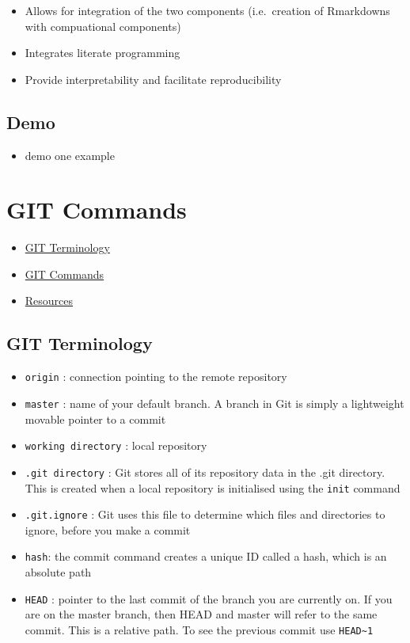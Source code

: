 \documentclass[
]{book}
\providecommand{\tightlist}{%
  \setlength{\itemsep}{0pt}\setlength{\parskip}{0pt}}
\begin{document}
\begin{itemize}
\tightlist
\item
  Allows for integration of the two components (i.e.~creation of Rmarkdowns with compuational components)
\item
  Integrates literate programming
\item
  Provide interpretability and facilitate reproducibility
\end{itemize}

\hypertarget{demo}{%
\section{Demo}\label{demo}}

\begin{itemize}
\tightlist
\item
  demo one example
\end{itemize}

\hypertarget{git-commands}{%
\chapter{GIT Commands}\label{git-commands}}

\begin{itemize}
\tightlist
\item
  \protect\hyperlink{git-terminology}{GIT Terminology}
\item
  \protect\hyperlink{git-commands}{GIT Commands}
\item
  \protect\hyperlink{resources}{Resources}
\end{itemize}

\hypertarget{git-terminology}{%
\section{GIT Terminology}\label{git-terminology}}

\begin{itemize}
\item
  \texttt{origin} : connection pointing to the remote repository
\item
  \texttt{master} : name of your default branch. A branch in Git is simply a lightweight movable pointer to a commit
\item
  \texttt{working\ directory} : local repository
\item
  \texttt{.git\ directory} : Git stores all of its repository data in the .git directory. This is created when a local repository is initialised using the \texttt{init} command
\item
  \texttt{.git.ignore} : Git uses this file to determine which files and directories to ignore, before you make a commit
\item
  \texttt{hash}: the commit command creates a unique ID called a hash, which is an absolute path
\item
  \texttt{HEAD} : pointer to the last commit of the branch you are currently on. If you are on the master branch, then HEAD and master will refer to the same commit. This is a relative path. To see the previous commit use \texttt{HEAD\textasciitilde{}1}
\end{itemize}
\end{document}
